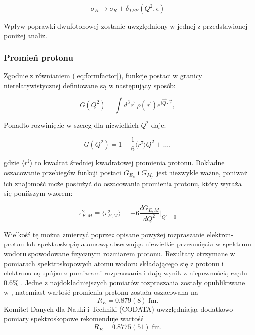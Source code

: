 \documentclass[11pt]{book}
\theoremstyle{definition}
\begin{document}
\begin{equation}
\sigma_R \rightarrow \sigma_R + \delta_{TPE}\left(Q^2, \epsilon\right)
\end{equation}

Wpływ poprawki dwufotonowej zostanie uwzględniony w jednej z przedstawionej poniżej analiz. 

\subsubsection{Promień protonu}

Zgodnie z równianiem (\ref{eq:formfactor}), funkcje postaci w granicy nierelatywistycznej definiowane są w następujący sposób:

\begin{equation*}
G(Q^2) = \int d^3 \vec{r} \; \rho(\vec{r}) e^{i\vec{Q}\cdot \vec{r}} ,
\end{equation*}

Ponadto rozwinięcie w szereg dla niewielkich $Q^2$ daje:

\begin{equation}
G(Q^2) = 1 - \frac{1}{6}\langle r^2 \rangle Q^2 + \dots,
\end{equation}

gdzie $\langle r^2 \rangle$ to kwadrat średniej kwadratowej promienia protonu. 
Dokładne oszacowanie przebiegów funkcji postaci $G_{E_p}$ i $G_{M_p}$ jest niezwykle ważne, poniważ ich znajomość może posłużyć do oszacowania promienia protonu, który wyraża się poniższym wzorem: 



\begin{equation}
r_{E,M}^2 \equiv \langle r_{E,M}^2  \rangle = -6 \frac{d G_{E,M}}{d Q^2} \biggr\rvert_{Q^2 = 0}
\end{equation}

Wielkość tę można zmierzyć poprzez opisane powyżej rozpraszanie elektron-proton lub spektroskopię atomową obserwując niewielkie przesunięcia w spektrum wodoru spowodowane fizycznym rozmiarem protonu. Rezultaty otrzymane w pomiarach spektroskopowych atomu wodoru składającego się z protonu i elektronu są spójne z pomiarami rozpraszania i dają wynik z niepewnością rzędu 0.6\% \cite{Carlson:2015jba}. Jedne z najdokładniejszych pomiarów rozpraszania zostały opublikowane w \cite{Bernauer:2010wm}, natomiast wartość promienia protonu została oszacowana na
%
\begin{equation}
R_E = 0.879(8) \; \text{fm}.
\end{equation}
%
Komitet Danych dla Nauki i Techniki (CODATA) uwzględniając dodatkowo pomiary spektroskopowe rekomenduje wartość \cite{2012RvMP...84.1527M}
%
\begin{equation}
R_E = 0.8775(51) \; \text{fm}. \label{r_codata}
\end{equation}
\end{document}
